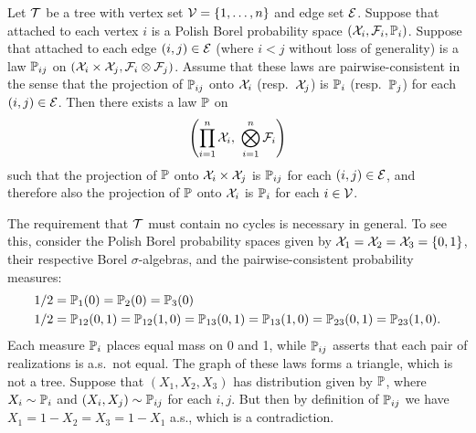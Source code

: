 \begin{lemma}
  \label{lem:kernel_app_vbp}

  Let $\cT$ be a tree with vertex set $\cV = \{1, \ldots, n\}$
  and edge set $\cE$.
  Suppose that attached to each vertex $i$ is a
  Polish Borel probability space
  $(\cX_i, \cF_i, \P_i)$.
  Suppose that attached to each edge $(i,j) \in \cE$
  (where $i<j$ without loss of generality)
  is a law $\P_{i j}$ on
  $(\cX_i \times \cX_j, \cF_i \otimes \cF_j)$.
  Assume that these laws are pairwise-consistent in the sense that
  the projection of $\P_{i j}$ onto
  $\cX_i$ (resp.\ $\cX_j$) is $\P_i$ (resp.\ $\P_j$)
  for each $(i,j) \in \cE$.
  Then there exists a law $\P$ on
  \begin{align*}
    \left(
      \prod_{i=1}^n \cX_i, \
      \bigotimes_{i=1}^n \cF_i
    \right)
  \end{align*}
  such that the projection of $\P$
  onto $\cX_i \times \cX_j$
  is $\P_{i j}$ for each $(i,j) \in \cE$,
  and therefore also the projection of $\P$
  onto $\cX_i$ is $\P_i$ for each $i \in \cV$.

\end{lemma}

\begin{remark}
  The requirement that $\cT$ must contain no cycles
  is necessary in general.
  To see this, consider the Polish Borel probability spaces
  given by
  $\cX_1 = \cX_2 = \cX_3 = \{0,1\}$,
  their respective Borel $\sigma$-algebras,
  and the pairwise-consistent probability measures:
  \begin{align*}
    1/2
    &=
    \P_1(0) = \P_2(0) = \P_3(0) \\
    1/2
    &=
    \P_{12}(0,1) = \P_{12}(1,0) =
    \P_{13}(0,1) = \P_{13}(1,0) =
    \P_{23}(0,1) = \P_{23}(1,0).
  \end{align*}
  Each measure $\P_i$ places equal mass on 0 and 1, while $\P_{i j}$
  asserts that each pair of realizations is a.s.\ not equal.
  The graph of these laws forms a triangle,
  which is not a tree.
  Suppose that $(X_1,X_2,X_3)$ has distribution given by $\P$,
  where $X_i \sim \P_i$ and $(X_i,X_j) \sim \P_{i j}$
  for each $i,j$.
  But then by definition of $\P_{i j}$ we have
  $X_1 = 1-X_2 = X_3 = 1-X_1$ a.s.,
  which is a contradiction.

\end{remark}

